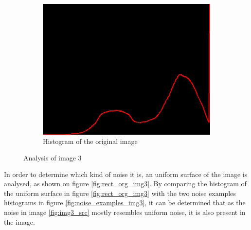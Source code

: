 \begin{figure}[H]
\begin{subfigure}[b]{0.485\textwidth}
        \includegraphics[width=\textwidth]{img3/hist_org_img3.png}
        \caption{Histogram of the original image}
        \label{fig:img3_hist}
    \end{subfigure}
    \caption{Analysis of image 3}
    \label{fig:img3}
\end{figure}
In order to determine which kind of noise it is, an uniform surface of the image is analysed, as shown on figure \ref{fig:rect_org_img3}. By comparing the histogram of the uniform surface in figure \ref{fig:rect_org_img3} with the two noise examples histograms in figure \ref{fig:noise_examples_img3}, it can be determined that as the noise in image \ref{fig:img3_src} mostly resembles uniform noise, it is also present in the image. 

